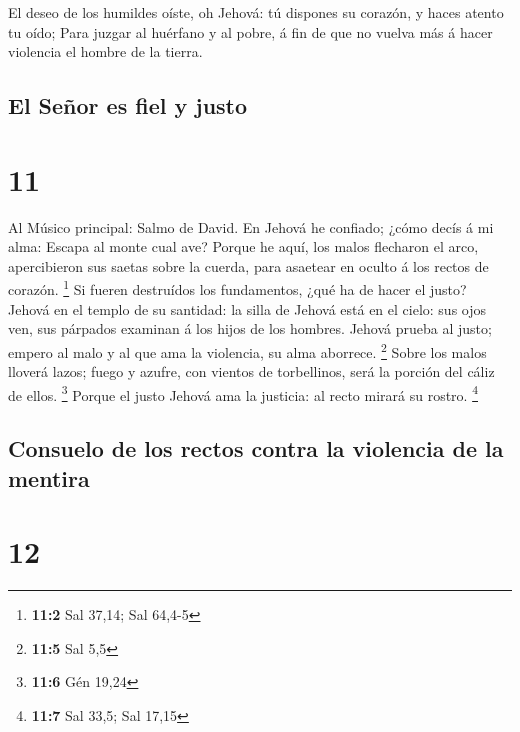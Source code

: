  El deseo de los humildes oíste, oh Jehová: tú dispones su
corazón, y haces atento tu oído;  Para juzgar al huérfano y
al pobre, á fin de que no vuelva más á hacer violencia el hombre de la
tierra.

\hypertarget{el-seuxf1or-es-fiel-y-justo}{%
\subsection{El Señor es fiel y
justo}\label{el-seuxf1or-es-fiel-y-justo}}

\hypertarget{section-10}{%
\section{11}\label{section-10}}

 Al Músico principal: Salmo de David. En Jehová he confiado;
¿cómo decís á mi alma: Escapa al monte cual ave?  Porque he
aquí, los malos flecharon el arco, apercibieron sus saetas sobre la
cuerda, para asaetear en oculto á los rectos de corazón. \footnote{\textbf{11:2}
  Sal 37,14; Sal 64,4-5}  Si fueren destruídos los
fundamentos, ¿qué ha de hacer el justo?  Jehová en el templo
de su santidad: la silla de Jehová está en el cielo: sus ojos ven, sus
párpados examinan á los hijos de los hombres.  Jehová prueba
al justo; empero al malo y al que ama la violencia, su alma aborrece.
\footnote{\textbf{11:5} Sal 5,5}  Sobre los malos lloverá
lazos; fuego y azufre, con vientos de torbellinos, será la porción del
cáliz de ellos. \footnote{\textbf{11:6} Gén 19,24}  Porque
el justo Jehová ama la justicia: al recto mirará su rostro. \footnote{\textbf{11:7}
  Sal 33,5; Sal 17,15}

\hypertarget{consuelo-de-los-rectos-contra-la-violencia-de-la-mentira}{%
\subsection{Consuelo de los rectos contra la violencia de la
mentira}\label{consuelo-de-los-rectos-contra-la-violencia-de-la-mentira}}

\hypertarget{section-11}{%
\section{12}\label{section-11}}

